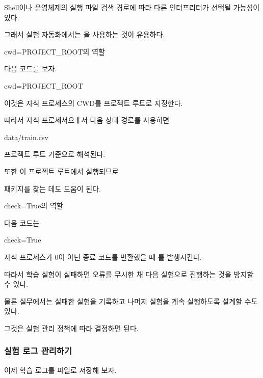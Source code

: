 Shell이나 운영체제의 실행 파일 검색 경로에 따라 다른 인터프리터가 선택될 가능성이 있다.

그래서 실험 자동화에서는 을 사용하는 것이 유용하다.

\begin{dhknote}
\begin{dhksmry}[centered]
cwd=PROJECT_ROOT의 역할
\end{dhksmry}
\end{dhknote}

다음 코드를 보자.

\begin{dhkcode}
cwd=PROJECT_ROOT
\end{dhkcode}

이것은 자식 프로세스의 CWD를 프로젝트 루트로 지정한다.

따라서 자식 프로세서으ㅔ서 다음 상대 경로를 사용하면

\begin{dhkzsh}
data/train.csv
\end{dhkzsh}

프로젝트 루트 기준으로 해석된다.

또한 이 프로젝트 루트에서 실행되므로

 패키지를 찾는 데도 도움이 된다.

\begin{dhknote}
\begin{dhksmry}[centered]
check=True의 역할
\end{dhksmry}
\end{dhknote}

다음 코드는

\begin{dhkcode}
check=True
\end{dhkcode}

자식 프로세스가 0이 아닌 종료 코드를 반환했을 때 를 발생시킨다.

따라서 학습 실험이 실패하면 오류를 무시한 채 다음 실험으로 진행하는 것을 방지할 수 있다.

물론 실무에서는 실패한 실험을 기록하고 나머지 실험을 계속 실행하도록 설계할 수도 있다.

그것은 실험 관리 정책에 따라 결정하면 된다.

\subsubsection{실험 로그 관리하기}

이제 학습 로그를 파일로 저장해 보자.

